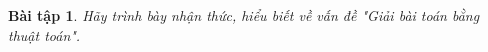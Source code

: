 \documentclass[14pt, a4paper]{article}
\theoremstyle{sltheorem}
\newtheorem{baitap}{Bài tập}
\theoremstyle{soltheorem}
\begin{document}
\begin{titlepage}






        \vfill %

    \end{titlepage}

    \nocite{*}

    \newpage

    \begin{baitap}
        Hãy trình bày nhận thức, hiểu biết về vấn đề "Giải bài toán bằng thuật toán".
    \end{baitap}
\end{document}

